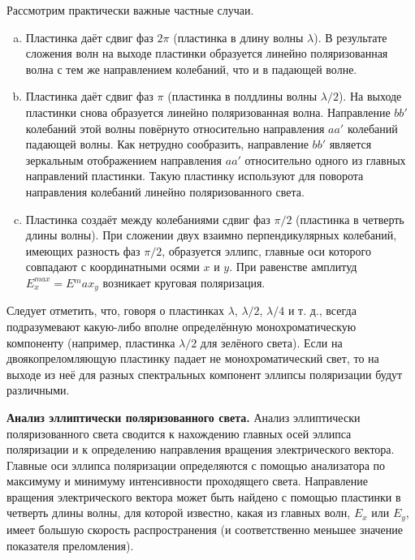 \documentclass[12pt]{article}
\begin{document}
    Рассмотрим практически важные частные случаи.
    \begin{enumerate}
        [a)]
        \item Пластинка даёт сдвиг фаз $2\pi$ (пластинка в длину волны $\lambda$).
        В результате сложения волн на выходе пластинки образуется
        линейно поляризованная волна с тем же направлением колебаний, что и в падающей волне.
        \item Пластинка даёт сдвиг фаз $π$ (пластинка в полдлины волны $\lambda/2$).
        На выходе пластинки снова образуется линейно поляризованная волна.
        Направление $bb'$ колебаний этой волны повёрнуто относительно направления $aa'$ колебаний падающей волны.
        Как нетрудно сообразить, направление $bb'$ является зеркальным отображением направления $aa'$
        относительно одного из главных направлений пластинки.
        Такую пластинку используют для поворота направления колебаний линейно поляризованного света.
        \item Пластинка создаёт между колебаниями сдвиг фаз $\pi/2$ (пластинка в четверть длины волны).
        При сложении двух взаимно перпендикулярных колебаний, имеющих разность фаз $\pi/2$, образуется эллипс, главные
        оси которого совпадают с координатными осями $x$ и $y$.
        При равенстве амплитуд $E^{max}_x = E{^max}_y$ возникает круговая поляризация.
    \end{enumerate}

    Следует отметить, что, говоря о пластинках $\lambda$, $\lambda/2$, $\lambda/4$ и т. д.,
    всегда подразумевают какую-либо вполне определённую монохроматическую компоненту
    (например, пластинка $\lambda/2$ для зелёного света).
    Если на двоякопреломляющую пластинку падает не монохроматический свет, то на
    выходе из неё для разных спектральных компонент эллипсы поляризации будут различными.

    \textbf{Анализ эллиптически поляризованного света.}
    Анализ эллиптически поляризованного света сводится к нахождению главных осей
    эллипса поляризации и к определению направления вращения электрического вектора.
    Главные оси эллипса поляризации определяются с помощью анализатора по максимуму и минимуму интенсивности проходящего света.
    Направление вращения электрического вектора может быть найдено с помощью пластинки в четверть длины волны, для которой известно,
    какая из главных волн, $E_x$ или $E_y$, имеет большую скорость распространения (и соответственно меньшее значение показателя преломления).
\end{document}
